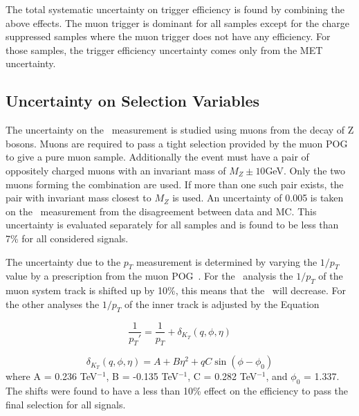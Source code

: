 The total systematic uncertainty on trigger efficiency is found by combining the above effects. 
The muon trigger is dominant for all samples except for the charge suppressed samples where the muon trigger does not have any efficiency.
For those samples, the trigger efficiency uncertainty comes only from the MET uncertainty.


\subsection{Uncertainty on Selection Variables}

The uncertainty on the \invbeta\ measurement is studied using muons from the decay of Z bosons. Muons are required to pass a tight selection provided by the muon POG to
give a pure muon sample. Additionally the event must have a pair of oppositely charged muons with an invariant mass of $M_Z \pm 10$GeV. Only the two muons forming the combination
are used. If more than one such pair exists, the pair with invariant mass closest to $M_Z$ is used. An uncertainty of 0.005 is taken on the \invbeta\ measurement
from the disagreement between data and MC. This uncertainty is evaluated separately for all samples and is found
to be less than 7\% for all considered signals.

The uncertainty due to the $p_T$ measurement is determined by varying the $1/p_T$ value by a prescription from the muon POG~\cite{2012JInst...7P0002T}. For the \muononly\
analysis the $1/p_T$ of the muon system track is shifted up by 10\%, this means that the \pt\ will decrease.
For the other analyses the $1/p_T$ of the inner track is adjusted by the Equation

\begin{equation}
 \frac{1}{p_T\prime} = \frac{1}{p_T} + \delta_{K_T}(q, \phi, \eta)
\end{equation}

\begin{equation}
 \delta_{K_T}(q, \phi, \eta) = A + B\eta^2 + qC\sin(\phi - \phi_0)
\end{equation}
where A = 0.236 TeV$^{-1}$, B = -0.135 TeV$^{-1}$,
C = 0.282 TeV$^{-1}$, and $\phi_0$ = 1.337. The shifts were found to have a less than 10\% effect on the efficiency to pass the final selection for all signals.

